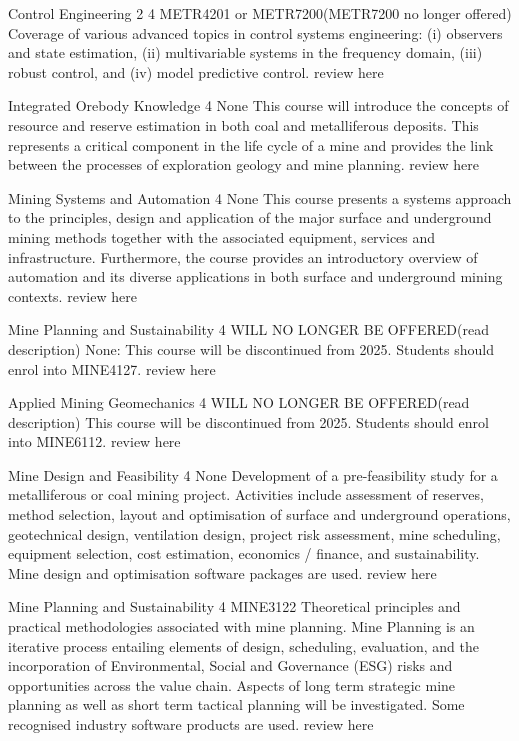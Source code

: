 {
	{Control Engineering 2}
	{4}
	{METR4201 or METR7200(METR7200 no longer offered)}
	{}
	{}
	{Coverage of various advanced topics in control systems engineering: (i) observers and state estimation, (ii) multivariable systems in the frequency domain, (iii) robust control, and (iv) model predictive control.}
	{review here}

	{Integrated Orebody Knowledge}
	{4}
	{None}
	{}
	{}
	{This course will introduce the concepts of resource and reserve estimation in both coal and metalliferous deposits. This represents a critical component in the life cycle of a mine and provides the link between the processes of exploration geology and mine planning.}
	{review here}

	{Mining Systems and Automation}
	{4}
	{None}
	{}
	{}
	{This course presents a systems approach to the principles, design and application of the major surface and underground mining methods together with the associated equipment, services and infrastructure. Furthermore, the course provides an introductory overview of automation and its diverse applications in both surface and underground mining contexts.}
	{review here}

	{Mine Planning and Sustainability}
	{4}
	{WILL NO LONGER BE OFFERED(read description)}
	{}
	{}
	{ None: This course will be discontinued from 2025. Students should enrol into MINE4127.}
	{review here}

	{Applied Mining Geomechanics}
	{4}
	{WILL NO LONGER BE OFFERED(read description)}
	{}
	{}
	{This course will be discontinued from 2025. Students should enrol into MINE6112.}
	{review here}

	{Mine Design and Feasibility}
	{4}
	{None}
	{}
	{}
	{Development of a pre-feasibility study for a metalliferous or coal mining project. Activities include assessment of reserves, method selection, layout and optimisation of surface and underground operations, geotechnical design, ventilation design, project risk assessment, mine scheduling, equipment selection, cost estimation, economics / finance, and sustainability. Mine design and optimisation software packages are used.}
	{review here}

	{Mine Planning and Sustainability}
	{4}
	{MINE3122}
	{}
	{}
	{Theoretical principles and practical methodologies associated with mine planning. Mine Planning is an iterative process entailing elements of design, scheduling, evaluation, and the incorporation of Environmental, Social and Governance (ESG) risks and opportunities across the value chain. Aspects of long term strategic mine planning as well as short term tactical planning will be investigated. Some recognised industry software products are used.}
	{review here}

}
